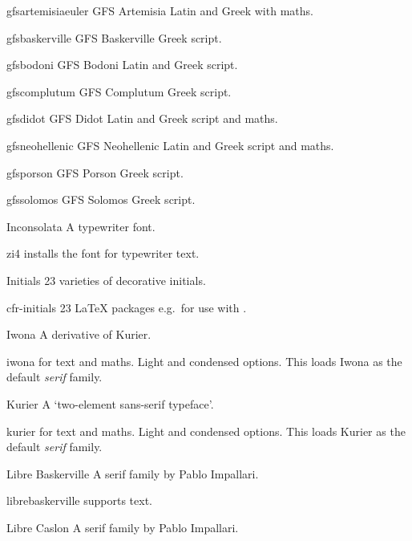 \documentclass[a4paper,welsh,british,twocolumn]{article}
\begin{document}
\begin{fontopts}
\begin{pkgdescription}
	\item[gfsartemisiaeuler] GFS Artemisia Latin and Greek with  maths.
	\item[gfsbaskerville] GFS Baskerville Greek script.
	\item[gfsbodoni] GFS Bodoni Latin and Greek script.
	\item[gfscomplutum] GFS Complutum Greek script.
	\item[gfsdidot] GFS Didot Latin and Greek script and maths.
	\item[gfsneohellenic] GFS Neohellenic Latin and Greek script and maths.
	\item[gfsporson] GFS Porson Greek script.
	\item[gfssolomos] GFS Solomos Greek script.
  \end{pkgdescription}
  \item[Inconsolata] A typewriter font.
  \begin{pkgdescription}
    \item[zi4] installs the font for typewriter text.
  \end{pkgdescription}
  \item[Initials] 23 varieties of decorative initials.
  \begin{pkgdescription}
	\item[cfr-initials] 23 \LaTeX{} packages e.g.~for use with .
  \end{pkgdescription}
  \item[Iwona] A derivative of Kurier.
  \begin{pkgdescription}
    \item[iwona] for text and maths.
	Light and condensed options.
	This loads Iwona as the default \emph{serif} family.
  \end{pkgdescription}
  \item[Kurier] A ‘two-element sans-serif typeface’.
  \begin{pkgdescription}
    \item[kurier] for text and maths.
	Light and condensed options.
	This loads Kurier as the default \emph{serif} family.
  \end{pkgdescription}
   \item[Libre Baskerville] A serif family by Pablo Impallari.
  \begin{pkgdescription}
    \item[librebaskerville] supports text.
  \end{pkgdescription}
   \item[Libre Caslon] A serif family by Pablo Impallari.

\end{fontopts}
\end{document}
